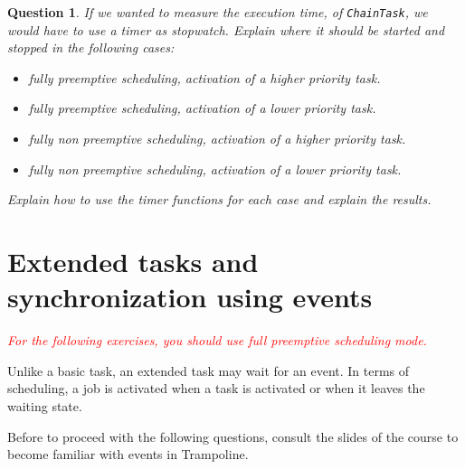 \documentclass[11pt]{report}
\newtheorem{ex}{Question}
\begin{document}
\begin{ex}
  If we wanted to measure the execution time, of \lstinline{ChainTask}, we would have to use a timer as stopwatch. Explain where it should be started and stopped in the following cases:
  \begin{itemize}
    \item fully preemptive scheduling, activation of a higher priority task.
    \item fully preemptive scheduling, activation of a lower priority task.
    \item fully non preemptive scheduling, activation of a higher priority task.
    \item fully non preemptive scheduling, activation of a lower priority task.
  \end{itemize}

  Explain how to use the timer functions for each case and explain the results.
\end{ex}

\section{Extended tasks and synchronization using events}

\textcolor{red}{\emph{For the following exercises, you should use full preemptive scheduling mode.}}

Unlike a basic task, an extended task may wait for an event.
In terms of scheduling, a job is activated when a task is activated or when it leaves the waiting state.

Before to proceed with the following questions, consult the slides of the course to become familiar with events in Trampoline.

\end{document}
